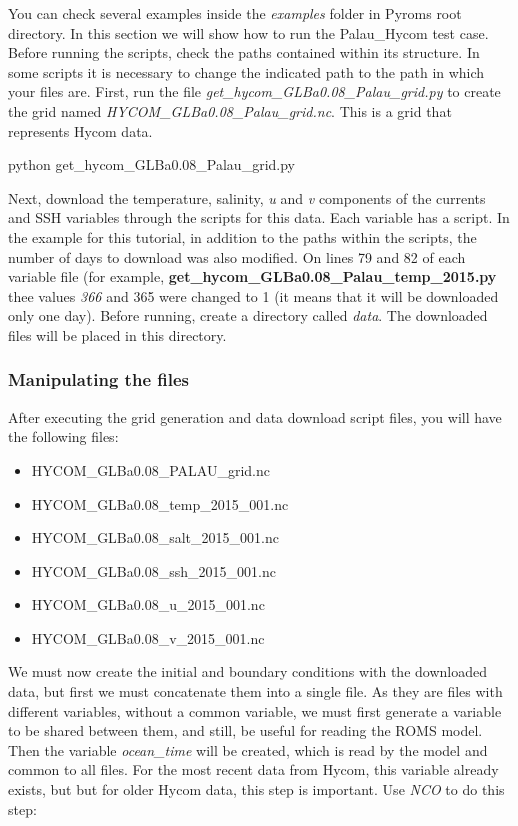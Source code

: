\noindent You can check several examples inside the \textit{examples} folder in Pyroms root directory. In this section 
we will show how to run the Palau\_Hycom test case. Before running the scripts, check the paths contained within its structure. 
In some scripts it is necessary to change the indicated path to the path in which your files are. First, run the file \textit{get\_hycom\_GLBa0.08\_Palau\_grid.py}
to create the grid named \textit{HYCOM\_GLBa0.08\_Palau\_grid.nc}. This is a grid that represents Hycom data.
\bigskip

\begin{bashcode}
python get_hycom_GLBa0.08_Palau_grid.py
\end{bashcode}
\bigskip

\noindent Next, download the temperature, salinity, \textit{u} and \textit{v} components of the currents and SSH variables 
through the scripts for this data. Each variable has a script. In the example for this tutorial, in addition to the paths within the scripts, the number of days 
to download was also modified. On lines 79 and 82 of each variable file (for example, \textbf{get\_hycom\_GLBa0.08\_Palau\_temp\_2015.py} thee values \textit{366} and
365 were changed to 1 (it means that it will be downloaded only one day). Before running, create a directory called \textit{data}. The downloaded files will be placed in
this directory.
\bigskip

\subsubsection{Manipulating the files}
\bigskip

\noindent After executing the grid generation and data download script files, you will have the following files:
\bigskip

\begin{itemize}
    \item HYCOM\_GLBa0.08\_PALAU\_grid.nc
    \item HYCOM\_GLBa0.08\_temp\_2015\_001.nc
    \item HYCOM\_GLBa0.08\_salt\_2015\_001.nc
    \item HYCOM\_GLBa0.08\_ssh\_2015\_001.nc   
    \item HYCOM\_GLBa0.08\_u\_2015\_001.nc
    \item HYCOM\_GLBa0.08\_v\_2015\_001.nc    
\end{itemize}
\bigskip

\noindent We must now create the initial and boundary conditions with the downloaded data, but first we must concatenate them into a single file. 
As they are files with different variables, without a common variable, we must first generate a variable to be shared between them, and still, be useful 
for reading the ROMS model. Then the variable \textit{ocean\_time} will be created, which is read by the model and common to all files.
For the most recent data from Hycom, this variable already exists, but but for older Hycom data, this step is important. Use \textit{NCO} to do this step:
\bigskip

